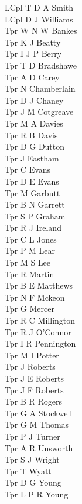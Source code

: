 \begin{multicols}{4}
  LCpl T D A Smith \\
  LCpl D J Williams \\
  Tpr W N W Bankes \\
  Tpr K J Beatty \\
  Tpr I J P Berry \\
  Tpr T D Bradshawe \\
  Tpr A D Carey \\
  Tpr N Chamberlain \\
  Tpr D J Chaney \\
  Tpr J M Cotgreave \\
  Tpr M A Davies \\
  Tpr R B Davis \\
  Tpr D G Dutton \\
  Tpr J Eastham \\
  Tpr C Evans \\
  Tpr D E Evans \\
  Tpr M Garbutt \\
  Tpr B N Garrett \\
  Tpr S P Graham \\
  Tpr R J Ireland \\
  Tpr C L Jones \\
  Tpr P M Lear \\
  Tpr M S Lee \\
  Tpr R Martin \\
  Tpr B E Matthews \\
  Tpr N F Mckeon \\
  Tpr G Mercer \\
  Tpr R C Millington \\
  Tpr R J O'Connor \\
  Tpr I R Pennington \\
  Tpr M I Potter \\
  Tpr J Roberts \\
  Tpr J E Roberts \\
  Tpr J F Roberts \\
  Tpr B R Rogers \\
  Tpr G A Stockwell \\
  Tpr G M Thomas \\
  Tpr P J Turner \\
  Tpr A R Unsworth \\
  Tpr S J Wright \\
  Tpr T Wyatt \\
  Tpr D G Young \\
  Tpr L P R Young \\
  \\

\end{multicols}
